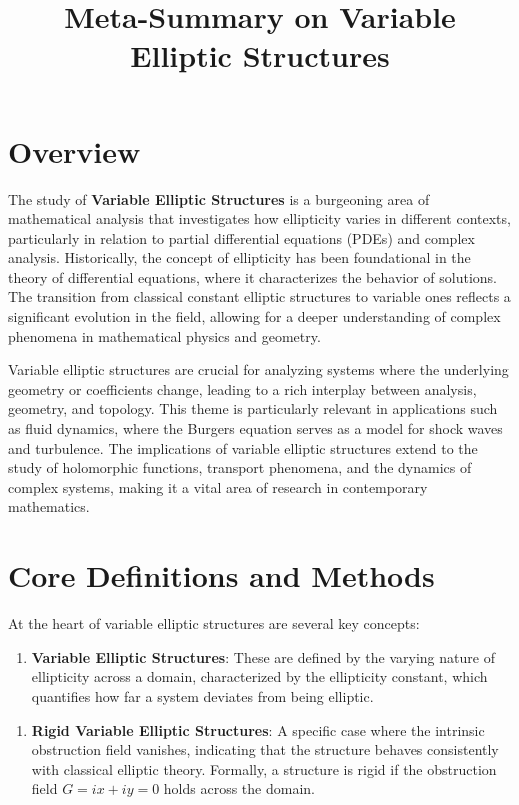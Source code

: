 \documentclass[11pt,a4paper]{article}
\title{Meta-Summary on Variable Elliptic Structures}
\date{}
\begin{document}
\maketitle

\section{Overview}

The study of \textbf{Variable Elliptic Structures} is a burgeoning area of mathematical analysis that investigates how ellipticity varies in different contexts, particularly in relation to partial differential equations (PDEs) and complex analysis. Historically, the concept of ellipticity has been foundational in the theory of differential equations, where it characterizes the behavior of solutions. The transition from classical constant elliptic structures to variable ones reflects a significant evolution in the field, allowing for a deeper understanding of complex phenomena in mathematical physics and geometry.

Variable elliptic structures are crucial for analyzing systems where the underlying geometry or coefficients change, leading to a rich interplay between analysis, geometry, and topology. This theme is particularly relevant in applications such as fluid dynamics, where the Burgers equation serves as a model for shock waves and turbulence. The implications of variable elliptic structures extend to the study of holomorphic functions, transport phenomena, and the dynamics of complex systems, making it a vital area of research in contemporary mathematics.

\section{Core Definitions and Methods}

At the heart of variable elliptic structures are several key concepts:

\begin{enumerate}
\item \textbf{Variable Elliptic Structures}: These are defined by the varying nature of ellipticity across a domain, characterized by the ellipticity constant, which quantifies how far a system deviates from being elliptic.
\end{enumerate}

\begin{enumerate}
\item \textbf{Rigid Variable Elliptic Structures}: A specific case where the intrinsic obstruction field vanishes, indicating that the structure behaves consistently with classical elliptic theory. Formally, a structure is rigid if the obstruction field \( G = i x + i y = 0 \) holds across the domain.
\end{enumerate}
\end{document}
